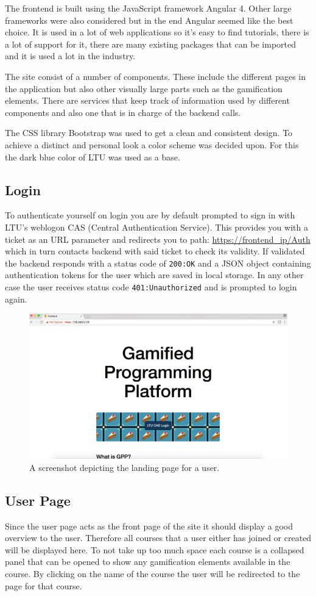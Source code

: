 The frontend is built using the JavaScript framework Angular 4. Other large frameworks were also considered but in the end Angular seemed like the best choice. It is used in a lot of web applications so it's easy to find tutorials, there is a lot of support for it, there are many existing packages that can be imported and it is used a lot in the industry.

The site consist of a number of components. These include the different pages in the application but also other visually large parts such as the gamification elements. There are services that keep track of information used by different components and also one that is in charge of the backend calls.

The CSS library Bootstrap was used to get a clean and consistent design. To achieve a distinct and personal look a color scheme was decided upon. For this the dark blue color of LTU was used as a base.

\subsection{Login}
To authenticate yourself on login you are by default prompted to sign in with LTU's weblogon CAS (Central Authentication Service). 
This provides you with a ticket as an URL parameter and redirects you to path: \url{https://frontend\_ip/Auth} which in turn contacts backend with said ticket to check its validity. If validated the backend responds with a status code of \texttt{200:\@ OK} and a JSON object containing authentication tokens for the user which are saved in local storage. In any other case the user receives status code \texttt{401:\@ Unauthorized} and is prompted to login again.
\begin{figure}[H]
    \centering
    \includegraphics[width=.45\textwidth]{img/gppinpictures/login2.png}
    \caption{A screenshot depicting the landing page for a user.}
    \label{fig:student}
\end{figure}

\subsection{User Page}
Since the user page acts as the front page of the site it should display a good overview to the user. Therefore all courses that a user either has joined or created will be displayed here. To not take up too much space each course is a collapsed panel that can be opened to show any gamification elements available in the course. By clicking on the name of the course the user will be redirected to the page for that course.

